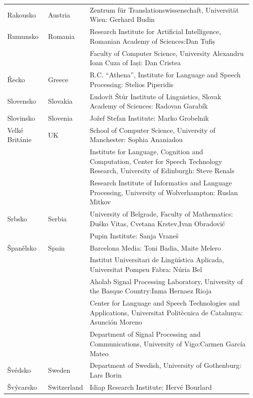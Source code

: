 \begin{longtable}{@{}llp{113mm}@{}}
    Rakousko & \textcolor{grey1}{Austria} & Zentrum für Translationswissenschaft, Universität Wien: Gerhard Budin\\ \addlinespace 
  Rumunsko & \textcolor{grey1}{Romania} & Research Institute for Artificial Intelligence, Romanian Academy of Sciences:\newline Dan Tufiș \\ \addlinespace
  & & Faculty of Computer Science, University Alexandru Ioan Cuza of Iași: Dan Cristea \\ \addlinespace
  Řecko & \textcolor{grey1}{Greece} & R.C. “Athena”, Institute for Language and Speech Processing: Stelios Piperidis\\ \addlinespace
  Slovensko & \textcolor{grey1}{Slovakia} & Ľudovít Štúr Institute of Linguistics, Slovak Academy of Sciences: Radovan Garabík \\ \addlinespace 
  Slovinsko & \textcolor{grey1}{Slovenia} & Jožef Stefan Institute: Marko Grobelnik \\ \addlinespace 
    Velké Británie & \textcolor{grey1}{UK} & 
  School of Computer Science, University of Manchester: Sophia Ananiadou  
  \\ \addlinespace & & Institute for Language, Cognition and Computation, Center for Speech Technology Research, University of Edinburgh: Steve Renals
  \\ \addlinespace & & Research Institute of Informatics and Language Processing, University of Wolverhampton: Ruslan Mitkov \\ \addlinespace 
  Srbsko & \textcolor{grey1}{Serbia} & University of Belgrade, Faculty of Mathematics: Duško Vitas, Cvetana Krstev,\newline Ivan Obradović \\ \addlinespace
  & & Pupin Institute: Sanja Vraneš \\ \addlinespace
  Španělsko & \textcolor{grey1}{Spain} & Barcelona Media: Toni Badia, Maite Melero \\ \addlinespace 
  & & Institut Universitari de Lingüística Aplicada, Universitat Pompeu Fabra: Núria Bel \\ \addlinespace 
  & & Aholab Signal Processing Laboratory, University of the Basque Country:\newline Inma Hernaez Rioja \\ \addlinespace 
  & & Center for Language and Speech Technologies and Applications, Universitat Politècnica de Catalunya:  Asunción Moreno \\ \addlinespace 
  & & Department of Signal Processing and Communications, University of Vigo:\newline Carmen García Mateo \\ \addlinespace
  Švédsko & \textcolor{grey1}{Sweden} & Department of Swedish, University of Gothenburg: Lars Borin \\ \addlinespace 
  Švýcarsko & \textcolor{grey1}{Switzerland} & Idiap Research Institute: Hervé Bourlard  
\end{longtable}
\normalsize
 
